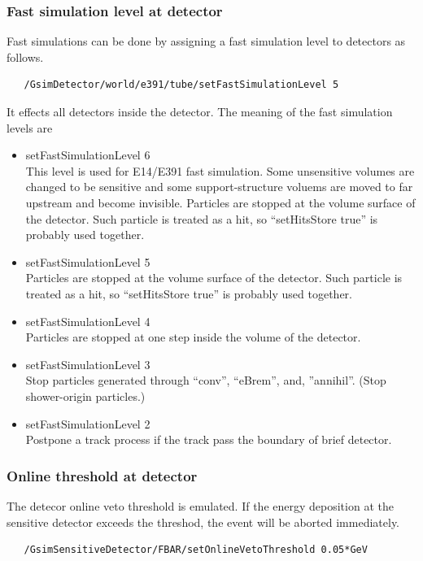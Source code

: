 \documentclass[a4paper,12pt]{article}
\begin{document}
  \subsubsection{Fast simulation level at detector}
  Fast simulations can be done by assigning a fast simulation level to
  detectors as follows.
  \begin{screen}
   \begin{verbatim}
   /GsimDetector/world/e391/tube/setFastSimulationLevel 5\end{verbatim}
  \end{screen}
  It effects all detectors inside the detector.
  The meaning of the fast simulation levels are
  \begin{itemize}
   \item setFastSimulationLevel 6\\
	 This level is used for E14/E391 fast simulation.
	 Some unsensitive volumes are changed to be sensitive and some
	 support-structure voluems are moved to far upstream and become
	 invisible. 
	 Particles are stopped at the volume surface of the
	 detector. Such particle is treated as a hit, so
	 ``setHitsStore true'' is probably used together.
   \item setFastSimulationLevel 5\\
	 Particles are stopped at the volume surface of the
	 detector. Such particle is treated as a hit, so
	 ``setHitsStore true'' is probably used together.
   \item setFastSimulationLevel 4\\
	 Particles are stopped at one step inside the volume of the
	 detector.
   \item setFastSimulationLevel 3\\
	 Stop particles generated through ``conv'', ``eBrem'', and,
	 ''annihil''. (Stop shower-origin particles.)
   \item setFastSimulationLevel 2\\
	 Postpone a track process if the track pass
	 the boundary of brief detector.
  \end{itemize}
   \subsubsection{Online threshold at detector}
   The detecor online veto threshold is emulated.
   If the energy deposition at the sensitive detector exceeds the
   threshod, the event will be aborted immediately.
   \begin{screen}
   \begin{verbatim}
   /GsimSensitiveDetector/FBAR/setOnlineVetoThreshold 0.05*GeV\end{verbatim}
  \end{screen}
\end{document}
